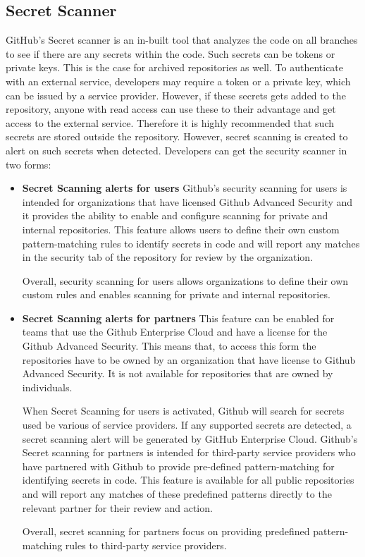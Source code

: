 \subsection{Secret Scanner}
GitHub's Secret scanner is an in-built tool that analyzes the code on all branches to see if there are any secrets within the code. Such secrets can be tokens or private keys. This is the case for archived repositories as well. To authenticate with an external service, developers may require a token or a private key, which can be issued by a service provider. However, if these secrets gets added to the repository, anyone with read access can use these to their advantage and get access to the external service. Therefore it is highly recommended that such secrets are stored outside the repository. However, secret scanning is created to alert on such secrets when detected. Developers can get the
security scanner in two forms\cite{GithubSecretScanning}: 
\begin{itemize}
    \item \textbf{Secret Scanning alerts for users}
Github's security scanning for users is intended for organizations that have licensed Github Advanced Security and it provides the ability to enable and configure scanning for private and internal repositories. This feature allows users to define their own custom pattern-matching rules to identify secrets in code and will report any matches in the security tab of the repository for review by the organization. 

Overall, security scanning for users allows organizations to define their own custom rules and enables scanning for private and internal repositories.

\item \textbf{Secret Scanning alerts for partners}
This feature can be enabled for teams that use the Github Enterprise Cloud and have a license for the Github Advanced Security. This means that, to access this form the repositories have to be owned by an organization that have license to Github Advanced Security. It is not available for repositories that are owned by individuals. 

When Secret Scanning for users is activated, Github will search for secrets used be various of service providers. If any supported secrets are detected, a secret scanning alert will be generated by GitHub Enterprise Cloud.
Github's Secret scanning for partners is intended for  third-party service providers who have partnered with Github to provide pre-defined pattern-matching for identifying secrets in code. This feature is available for all public repositories and will report any matches of these predefined patterns directly to the relevant partner for their review and action. 

Overall, secret scanning for partners focus on providing predefined pattern-matching rules to third-party service providers. 
\end{itemize}

